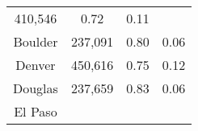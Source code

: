 \documentclass[12pt,twoside]{reedthesis}
\begin{document}
\begin{longtable}[]{@{}cccl@{}}
\begin{minipage}[t]{0.24\columnwidth}
  410,546\strut
  \end{minipage} & \begin{minipage}[t]{0.29\columnwidth}\centering\strut
  0.72\strut
  \end{minipage} & \begin{minipage}[t]{0.25\columnwidth}\raggedright\strut
  0.11\strut
  \end{minipage}\tabularnewline
  \begin{minipage}[t]{0.10\columnwidth}\centering\strut
  Boulder\strut
  \end{minipage} & \begin{minipage}[t]{0.24\columnwidth}\centering\strut
  237,091\strut
  \end{minipage} & \begin{minipage}[t]{0.29\columnwidth}\centering\strut
  0.80\strut
  \end{minipage} & \begin{minipage}[t]{0.25\columnwidth}\raggedright\strut
  0.06\strut
  \end{minipage}\tabularnewline
  \begin{minipage}[t]{0.10\columnwidth}\centering\strut
  Denver\strut
  \end{minipage} & \begin{minipage}[t]{0.24\columnwidth}\centering\strut
  450,616\strut
  \end{minipage} & \begin{minipage}[t]{0.29\columnwidth}\centering\strut
  0.75\strut
  \end{minipage} & \begin{minipage}[t]{0.25\columnwidth}\raggedright\strut
  0.12\strut
  \end{minipage}\tabularnewline
  \begin{minipage}[t]{0.10\columnwidth}\centering\strut
  Douglas\strut
  \end{minipage} & \begin{minipage}[t]{0.24\columnwidth}\centering\strut
  237,659\strut
  \end{minipage} & \begin{minipage}[t]{0.29\columnwidth}\centering\strut
  0.83\strut
  \end{minipage} & \begin{minipage}[t]{0.25\columnwidth}\raggedright\strut
  0.06\strut
  \end{minipage}\tabularnewline
  \begin{minipage}[t]{0.10\columnwidth}\centering\strut
  El Paso\strut
  \end{minipage} & \begin{minipage}[t]{0.24\columnwidth}\centering\strut

\end{minipage}
\end{longtable}
\end{document}
